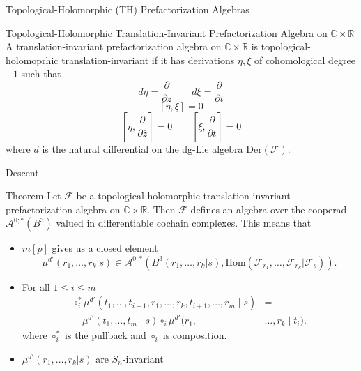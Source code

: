 \documentclass{beamer}
\newcommand{\C}{\mathbb{C}}
\newcommand{\R}{\mathbb{R}}
\begin{document}
\begin{frame}{Topological-Holomorphic (TH) Prefactorization Algebras}
    \begin{block}{Topological-Holomorphic Translation-Invariant Prefactorization Algebra on $\C \times \R$}
         A translation-invariant prefactorization algebra on $\C \times \R$ is topological-holomoprhic translation-invariant if it has derivations $\eta,\xi$ of cohomological degree $-1$ such that
                  \[
                      d\eta= \frac{\partial}{\partial \bar{z}}  \qquad d\xi = \frac{\partial}{\partial t}
                  \]
                  \[
                      [\eta,\xi]=0
                  \]
                  \[
                      [\eta,\frac{\partial}{\partial \bar{z}}] = 0 \qquad [\xi,\frac{\partial}{\partial t}]=0
                  \]
        where $d$ is the natural differential on the dg-Lie algebra $\mbox{Der}(\mathcal{F})$.
    \end{block}
\end{frame}


\begin{frame}{Descent}
    \begin{block}{Theorem}
        Let $\mathcal{F}$ be a topological-holomorphic translation-invariant prefactorization algebra on $\C\times \R$. Then $\mathcal{F}$  defines an algebra over the cooperad $\mathcal{A}^{0;*}(B^{3})$ valued in differentiable cochain complexes. This means that 
        \begin{itemize}
        
        \item $m[p]$ gives us a closed element 
        \[
            \mu^{d'}(r_1,\dots,r_k|s) \in \mathcal{A}^{0;*}(B^3(r_1,\dots,r_k|s), \mathrm{Hom}(\mathcal{F}_{r_1},\dots,\mathcal{F}_{r_k}|\mathcal{F}_s)).
        \]
        
        \item For all $1\leq i \leq m$
              \[
\begin{aligned}
\circ_i^* \mu^{d'}(t_1,\dotsc,t_{i-1},r_1,\dotsc,r_k,t_{i+1},\dotsc,r_m \mid s)
&= \\
\quad \mu^{d'}(t_1,\dotsc,t_m \mid s)\circ_i  \mu^{d'}(r_1, &\dotsc,r_k \mid t_i).
\end{aligned}
\]
              where $\circ_i^*$ is the pullback and $\circ_i$ is composition.
        \item $\mu^{d'}(r_1,\dots,r_k|s)$ are $S_n$-invariant
        \end{itemize}

        
    \end{block}

\end{frame}
\end{document}
